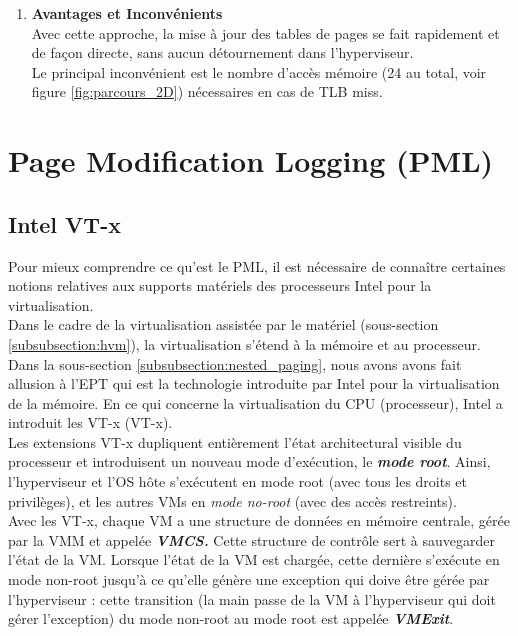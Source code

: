 \begin{enumerate}[label=\textbf{(\roman*)}]
    \item \textbf{Avantages et Inconvénients}\\
    Avec cette approche, la mise à jour des tables de pages se fait rapidement et de façon directe, sans aucun détournement dans l'hyperviseur.\\
    Le principal inconvénient est le nombre d'accès mémoire (24 au total, voir figure \ref{fig:parcours_2D}) nécessaires en cas de TLB miss.
\end{enumerate}

\section{Page Modification Logging (PML)}
\subsection{Intel VT-x}
\label{subsubsection:intel_vtx}
Pour mieux comprendre ce qu'est le PML, il est nécessaire de connaître certaines notions relatives aux supports matériels des processeurs Intel pour la virtualisation.\\
Dans le cadre de la virtualisation assistée par le matériel (sous-section \ref{subsubsection:hvm}), la virtualisation s'étend à la mémoire et au processeur.  Dans la sous-section \ref{subsubsection:nested_paging}, nous avons avons fait allusion à l'EPT qui est la technologie introduite par Intel pour la virtualisation de la mémoire. En ce qui concerne la virtualisation du CPU (processeur), Intel a introduit les \acs{VT-x} (\acl{VT-x}).\\
Les extensions \acs{VT-x} dupliquent entièrement l'état architectural visible du processeur et introduisent un nouveau mode d'exécution, le \textbf{\textit{mode root}}. Ainsi, l'hyperviseur et l'\acs{OS} hôte s'exécutent en mode root (avec tous les droits et privilèges), et les autres VMs en \textit{mode no-root} (avec des accès restreints).\\
Avec les VT-x, chaque VM a une structure de données en mémoire centrale, gérée par la \acs{VMM} et appelée \textit{\textbf{\ac{VMCS}.}} Cette structure de contrôle sert à sauvegarder l'état de la VM. Lorsque l'état de la VM est chargée, cette dernière s'exécute en mode non-root jusqu'à ce qu'elle génère une exception qui doive être gérée par l'hyperviseur : cette transition (la main passe de la VM à l'hyperviseur qui doit gérer l'exception) du mode non-root au mode root est appelée \textit{\textbf{VMExit}}.

